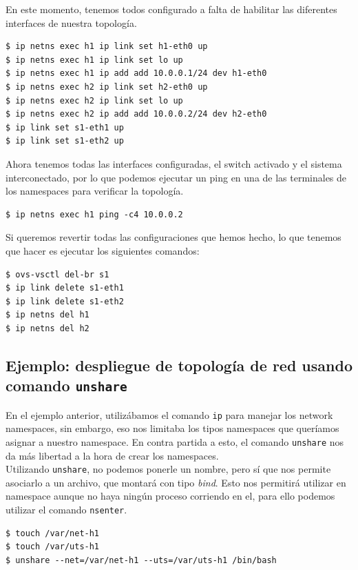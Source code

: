 \documentclass[12pt]{article}
\begin{document}
	\noindent En este momento, tenemos todos configurado a falta de habilitar las diferentes interfaces de nuestra topología.
	\begin{verbatim}
$ ip netns exec h1 ip link set h1-eth0 up
$ ip netns exec h1 ip link set lo up
$ ip netns exec h1 ip add add 10.0.0.1/24 dev h1-eth0
$ ip netns exec h2 ip link set h2-eth0 up
$ ip netns exec h2 ip link set lo up
$ ip netns exec h2 ip add add 10.0.0.2/24 dev h2-eth0
$ ip link set s1-eth1 up
$ ip link set s1-eth2 up
	\end{verbatim}

	\noindent Ahora tenemos todas las interfaces configuradas, el switch activado y el sistema interconectado, por lo que podemos ejecutar un ping en una de las terminales de los namespaces para verificar la topología.
	\begin{verbatim}
$ ip netns exec h1 ping -c4 10.0.0.2
	\end{verbatim}

	\noindent Si queremos revertir todas las configuraciones que hemos hecho, lo que tenemos que hacer es ejecutar los siguientes comandos:
	\begin{verbatim}
$ ovs-vsctl del-br s1
$ ip link delete s1-eth1
$ ip link delete s1-eth2
$ ip netns del h1
$ ip netns del h2
	\end{verbatim}

	\pagebreak

	\subsection{Ejemplo: despliegue de topología de red usando comando \texttt{unshare}}
	\noindent En el ejemplo anterior, utilizábamos el comando \texttt{ip} para manejar los network namespaces, sin embargo, eso nos limitaba los tipos namespaces que queríamos asignar a nuestro namespace. En contra partida a esto, el comando \texttt{unshare} nos da más libertad a la hora de crear los namespaces. \\
	
	\noindent Utilizando \texttt{unshare}, no podemos ponerle un nombre, pero sí que nos permite asociarlo a un archivo, que montará con tipo \textit{bind}. Esto nos permitirá utilizar en namespace aunque no haya ningún proceso corriendo en el, para ello podemos utilizar el comando \texttt{nsenter}.
	\begin{verbatim}
$ touch /var/net-h1
$ touch /var/uts-h1
$ unshare --net=/var/net-h1 --uts=/var/uts-h1 /bin/bash
	\end{verbatim}
\end{document}
